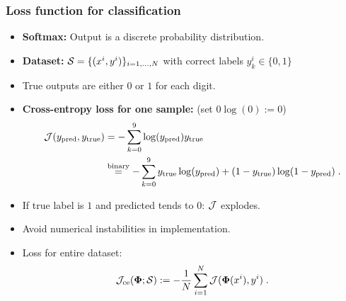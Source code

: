 \documentclass[10pt,hyperref={pdfpagelabels=false}]{beamer}
\begin{document}
\begin{frame}
    \frametitle{Loss function for classification}
        {\small
        \begin{itemize}
            \item {\bf Softmax:} Output is a discrete probability distribution.
            \item {\bf Dataset:} $\mathcal{S}=\{(x^i, y^i)\}_{i=1,\dots,N}$ with correct labels $y^i_k\in\{0,1\}$
            \item True outputs are either $0$ or $1$ for each digit.
            \item {\bf Cross-entropy loss for one sample:} (set $0\log(0):=0$)
                \begin{equation*}
                    \begin{split}
                        \mathcal{J}(y_{\text{pred}}, y_{\text{true}}) &=
                            -\sum_{k=0}^9 \log(y_{\text{pred}})y_{\text{true}} \\
                            &\stackrel{\text{binary}}{=}
                            -\sum_{k=0}^9 y_{\text{true}}\log(y_{\text{pred}})
                                + (1-y_{\text{true}}) \log(1-y_{\text{pred}})
                            \;.
                    \end{split}
                \end{equation*}
            \item If true label is $1$ and predicted tends to $0$: $\mathcal{J}$ explodes.
            \item Avoid numerical instabilities in implementation.
            \item Loss for entire dataset:
            $$
            \mathcal{J}_{\text{ce}}(\boldsymbol{\Phi}; \mathcal{S}) :=
                -\frac{1}{N}\sum_{i=1}^N \mathcal{J}(\boldsymbol{\Phi}(x^i), y^i)
                \;.
            $$

        \end{itemize}
        }
\end{frame}
\end{document}
